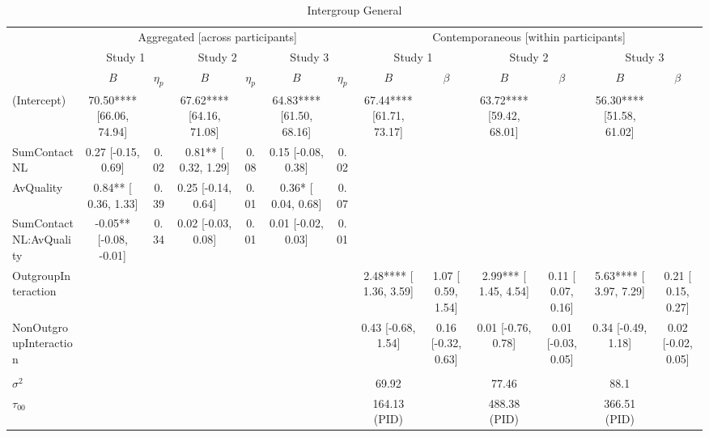 \begin{adjustbox}{width=\textwidth}
\begin{table}
\caption{\label{tab:intergroupGeneralTbl}Intergroup General}
\centering
\begin{tabular}[t]{lcccccccccccc}
\toprule
\multicolumn{1}{c}{} & \multicolumn{6}{c}{Aggregated [across participants]} & \multicolumn{6}{c}{Contemporaneous [within participants]} \\
\cmidrule(l{3pt}r{3pt}){2-7} \cmidrule(l{3pt}r{3pt}){8-13}
\multicolumn{1}{c}{} & \multicolumn{2}{c}{Study 1} & \multicolumn{2}{c}{Study 2} & \multicolumn{2}{c}{Study 3} & \multicolumn{2}{c}{Study 1} & \multicolumn{2}{c}{Study 2} & \multicolumn{2}{c}{Study 3} \\
\cmidrule(l{3pt}r{3pt}){2-3} \cmidrule(l{3pt}r{3pt}){4-5} \cmidrule(l{3pt}r{3pt}){6-7} \cmidrule(l{3pt}r{3pt}){8-9} \cmidrule(l{3pt}r{3pt}){10-11} \cmidrule(l{3pt}r{3pt}){12-13}
 & $B$ & $\eta_p$ & $B$ & $\eta_p$ & $B$ & $\eta_p$ & $B$ & $\beta$ & $B$ & $\beta$ & $B$ & $\beta$\\
\midrule
(Intercept) & 70.50**** [66.06, 74.94] &  & 67.62**** [64.16, 71.08] &  & 64.83**** [61.50, 68.16] &  & 67.44**** [61.71, 73.17] &  & 63.72**** [59.42, 68.01] &  & 56.30**** [51.58, 61.02] & \\
SumContactNL & 0.27 [-0.15,  0.69] & 0.02 & 0.81** [ 0.32,  1.29] & 0.08 & 0.15 [-0.08,  0.38] & 0.02 &  &  &  &  &  & \\
AvQuality & 0.84** [ 0.36,  1.33] & 0.39 & 0.25 [-0.14,  0.64] & 0.01 & 0.36* [ 0.04,  0.68] & 0.07 &  &  &  &  &  & \\
SumContactNL:AvQuality & -0.05** [-0.08, -0.01] & 0.34 & 0.02 [-0.03,  0.08] & 0.01 & 0.01 [-0.02,  0.03] & 0.01 &  &  &  &  &  & \\
OutgroupInteraction &  &  &  &  &  &  & 2.48**** [ 1.36,  3.59] & 1.07 [ 0.59,  1.54] & 2.99*** [ 1.45,  4.54] & 0.11 [ 0.07, 0.16] & 5.63**** [ 3.97,  7.29] & 0.21 [ 0.15, 0.27]\\
NonOutgroupInteraction &  &  &  &  &  &  & 0.43 [-0.68,  1.54] & 0.16 [-0.32,  0.63] & 0.01 [-0.76,  0.78] & 0.01 [-0.03, 0.05] & 0.34 [-0.49,  1.18] & 0.02 [-0.02, 0.05]\\
\addlinespace[0.3em]
\multicolumn{13}{l}{\textbf{Random}}\\
\hspace{1em}$\sigma^2$ &  &  &  &  &  &  & 69.92 &  & 77.46 &  & 88.1 & \\
\hspace{1em}$\tau_{00}$ &  &  &  &  &  &  & 164.13 (PID) &  & 488.38 (PID) &  & 366.51 (PID) & \\

\end{tabular}
\end{table}
\end{adjustbox}
